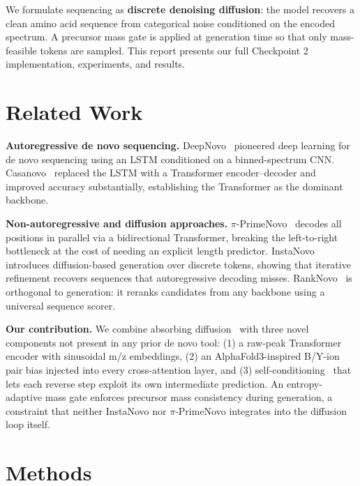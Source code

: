 \documentclass[11pt]{article}
\begin{document}
We formulate sequencing as \textbf{discrete denoising diffusion}: the model
recovers a clean amino acid sequence from categorical noise conditioned on the
encoded spectrum. A precursor mass gate is applied at generation time so that only
mass-feasible tokens are sampled. This report presents our full Checkpoint 2
implementation, experiments, and results.

\section{Related Work}

\textbf{Autoregressive de novo sequencing.}
DeepNovo~\cite{deepnovo} pioneered deep learning for de novo sequencing using an LSTM
conditioned on a binned-spectrum CNN. Casanovo~\cite{casanovo} replaced the LSTM with a
Transformer encoder--decoder and improved accuracy substantially, establishing the
Transformer as the dominant backbone.

\textbf{Non-autoregressive and diffusion approaches.}
$\pi$-PrimeNovo~\cite{primenovo} decodes all positions in parallel via a bidirectional
Transformer, breaking the left-to-right bottleneck at the cost of needing an explicit
length predictor. InstaNovo~\cite{instanovo} introduces diffusion-based generation over
discrete tokens, showing that iterative refinement recovers sequences that autoregressive
decoding misses. RankNovo~\cite{ranknovo} is orthogonal to generation: it reranks
candidates from any backbone using a universal sequence scorer.

\textbf{Our contribution.}
We combine absorbing diffusion~\cite{d3pm} with three novel components not present in any
prior de novo tool: (1) a raw-peak Transformer encoder with sinusoidal m/z embeddings,
(2) an AlphaFold3-inspired B/Y-ion pair bias injected into every cross-attention layer, and
(3) self-conditioning~\cite{chen2022,mdlm} that lets each reverse step exploit its own
intermediate prediction. An entropy-adaptive mass gate enforces precursor mass consistency
during generation, a constraint that neither InstaNovo nor $\pi$-PrimeNovo integrates
into the diffusion loop itself.

\section{Methods}
\end{document}
